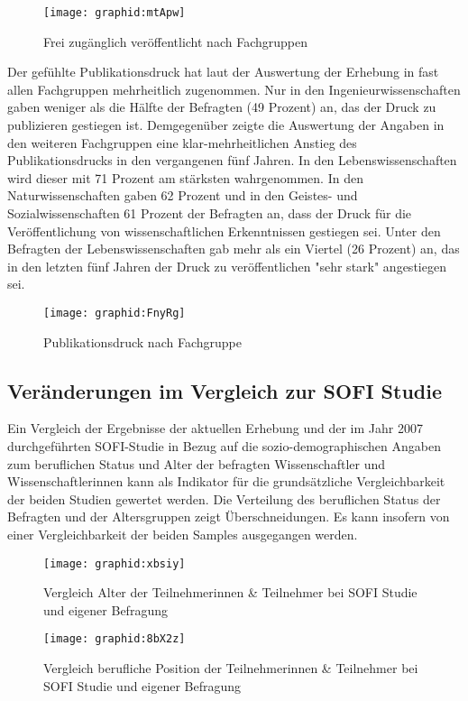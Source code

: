 \begin{figure}[h!]
\texttt{[image: graphid:mtApw]}
\caption{Frei zugänglich veröffentlicht nach Fachgruppen}
\end{figure}

Der gefühlte Publikationsdruck hat laut der Auswertung der Erhebung in fast allen Fachgruppen mehrheitlich zugenommen. Nur in den Ingenieurwissenschaften gaben weniger als die Hälfte der Befragten (49 Prozent) an, das der Druck zu publizieren gestiegen ist. Demgegenüber zeigte die Auswertung der Angaben in den weiteren Fachgruppen eine klar-mehrheitlichen Anstieg des Publikationsdrucks in den vergangenen fünf Jahren. In den Lebenswissenschaften wird dieser mit 71 Prozent am stärksten wahrgenommen. In den Naturwissenschaften gaben 62 Prozent und in den Geistes- und Sozialwissenschaften 61 Prozent der Befragten an, dass der Druck für die Veröffentlichung von wissenschaftlichen Erkenntnissen gestiegen sei. Unter den Befragten der Lebenswissenschaften gab mehr als ein Viertel (26 Prozent) an, das in den letzten fünf Jahren der Druck zu veröffentlichen "sehr stark" angestiegen sei.

\begin{figure}[h!]
\texttt{[image: graphid:FnyRg]}
\caption{Publikationsdruck nach Fachgruppe}
\end{figure}

\subsection{Veränderungen im Vergleich zur SOFI Studie}

Ein Vergleich der Ergebnisse der aktuellen Erhebung und der im Jahr 2007 durchgeführten SOFI-Studie in Bezug auf die sozio-demographischen Angaben zum beruflichen Status und Alter der befragten Wissenschaftler und Wissenschaftlerinnen kann als Indikator für die grundsätzliche Vergleichbarkeit der beiden Studien gewertet werden. Die Verteilung des beruflichen Status der Befragten und der Altersgruppen zeigt Überschneidungen. Es kann insofern von einer Vergleichbarkeit der beiden Samples ausgegangen werden.

\begin{figure}[h!]
\texttt{[image: graphid:xbsiy]}
\caption{Vergleich Alter der Teilnehmerinnen & Teilnehmer bei SOFI Studie und eigener Befragung}
\end{figure}

\begin{figure}[h!]
\texttt{[image: graphid:8bX2z]}
\caption{Vergleich berufliche Position der Teilnehmerinnen & Teilnehmer bei SOFI Studie und eigener Befragung}
\end{figure}

